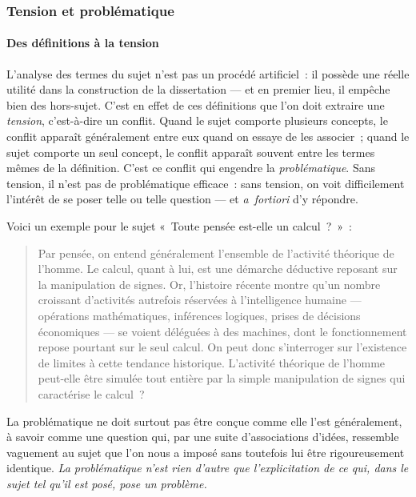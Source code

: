 \documentclass[a4paper,12pt]{article}
\begin{document}
\subsubsection{Tension et problématique}
\label{sec-2-2-2}

\paragraph{Des définitions à la tension}
\label{sec-2-2-2-1}

L'analyse des termes du sujet n'est pas un procédé artificiel : il
possède une réelle utilité dans la construction de la dissertation ---
et en premier lieu, il empêche bien des hors-sujet. C'est en effet de
ces définitions que l'on doit extraire une \emph{tension}, c'est-à-dire un
conflit. Quand le sujet comporte plusieurs concepts, le conflit apparaît
généralement entre eux quand on essaye de les associer ; quand le sujet
comporte un seul concept, le conflit apparaît souvent entre les termes
mêmes de la définition. C'est ce conflit qui engendre la
\emph{problématique}. Sans tension, il n'est pas de problématique efficace :
sans tension, on voit difficilement l'intérêt de se poser telle ou telle
question --- et \emph{a fortiori} d'y répondre.

Voici un exemple pour le sujet « Toute pensée est-elle un calcul ? » :

\begin{quote}
Par pensée, on entend généralement l'ensemble de l'activité théorique
de l'homme. Le calcul, quant à lui, est une démarche déductive
reposant sur la manipulation de signes. Or, l'histoire récente montre
qu'un nombre croissant d'activités autrefois réservées à
l'intelligence humaine --- opérations mathématiques, inférences
logiques, prises de décisions économiques --- se voient déléguées à
des machines, dont le fonctionnement repose pourtant sur le seul
calcul. On peut donc s'interroger sur l'existence de limites à cette
tendance historique. L'activité théorique de l'homme peut-elle être
simulée tout entière par la simple manipulation de signes qui
caractérise le calcul ?
\end{quote}

La problématique ne doit surtout pas être conçue comme elle l'est
généralement, à savoir comme une question qui, par une suite
d'associations d'idées, ressemble vaguement au sujet que l'on nous a
imposé sans toutefois lui être rigoureusement identique. \emph{La
problématique n'est rien d'autre que l'explicitation de ce qui, dans le
sujet tel qu'il est posé, pose un problème.}
\end{document}
